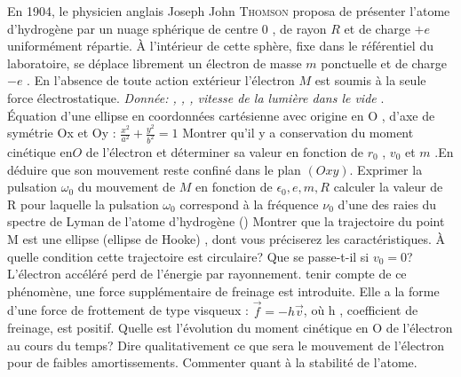 \begin{Exercise}[title=Modèle Atomique de Thomson]
  En 1904, le physicien anglais Joseph John \textsc{Thomson} proposa de présenter
  l'atome d'hydrogène par un nuage sphérique de centre $0$ , de rayon $R$ et de
  charge $+e$ uniformément répartie. À l'intérieur de cette sphère, fixe
  dans le référentiel du laboratoire, se déplace librement un électron de masse
  $m$ ponctuelle et de charge $-e$ .
  En l'absence de toute action extérieur l'électron $M$ est soumis à la seule
  force électrostatique.
  \emph{Donnée: ,  ,
    , vitesse de la lumière dans le vide
    }. \\
  Équation d'une ellipse en coordonnées cartésienne avec origine en O , d'axe de
  symétrie Ox et Oy : $\frac{x^2}{a^2}+\frac{y^2}{b^2}=1$
    \Question Montrer qu'il y a conservation du moment cinétique en$O$ de
    l'électron et déterminer sa valeur en fonction de $r_0$ , $v_0$ et $m$ .En
    déduire que son mouvement reste confiné dans le plan $( Oxy )$.
    \Question Exprimer la pulsation $\omega_0$ du mouvement de $M$ en fonction de
    $\epsilon_0,e,m,R$ calculer la valeur de R pour laquelle la pulsation $\omega_0$ correspond
    à la fréquence $\nu_0$ d'une des raies du spectre de Lyman de l'atome d'hydrogène
    ()
    \Question Montrer que la trajectoire du point M est une ellipse (ellipse de
    Hooke) , dont vous préciserez les caractéristiques.
    \Question À quelle condition cette trajectoire est circulaire? Que se
    passe-t-il si $v_0=0$?
    \Question L'électron accéléré perd de l'énergie par rayonnement. tenir
    compte de ce phénomène, une force supplémentaire de freinage est introduite.
    Elle a la forme d'une force de frottement de type visqueux :
    $\vec{f}=-h\vec{v} $, où h , coefficient de freinage, est positif.
    \subQuestion Quelle est l'évolution du moment cinétique en O de l'électron
    au cours du temps?
    \subQuestion Dire qualitativement ce que sera le mouvement de l'électron pour de
    faibles amortissements.
    \subQuestion Commenter quant à la stabilité de l'atome.
\end{Exercise}
